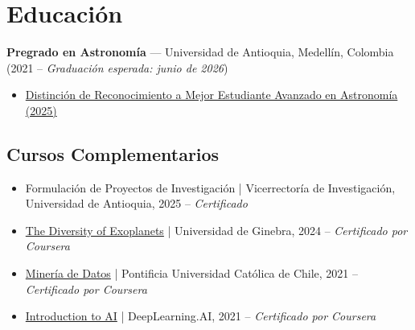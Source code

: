 \section*{Educación}
\textbf{Pregrado en Astronomía} — Universidad de Antioquia, Medellín, Colombia (2021 -- \textit{Graduación esperada: junio de 2026})
\begin{itemize}
    \item \href{https://drive.google.com/file/d/1U0p9EjMKj7JTylV96l90XCa1OudIKOIy/view?usp=sharing}{Distinción de Reconocimiento a Mejor Estudiante Avanzado en Astronomía (2025)}
\end{itemize}

\subsection*{Cursos Complementarios}
\begin{itemize}
    \item Formulación de Proyectos de Investigación | Vicerrectoría de Investigación, Universidad de Antioquia, 2025 -- \textit{Certificado}
    \item \href{https://www.coursera.org/learn/exoplanets}{The Diversity of Exoplanets} | Universidad de Ginebra, 2024 -- \textit{Certificado por Coursera}
    \item \href{https://www.coursera.org/learn/mineria-de-datos-introduccion}{Minería de Datos} | Pontificia Universidad Católica de Chile, 2021 -- \textit{Certificado por Coursera}
    \item \href{https://www.coursera.org/learn/ai-for-everyone}{Introduction to AI} | DeepLearning.AI, 2021 -- \textit{Certificado por Coursera}
\end{itemize}
